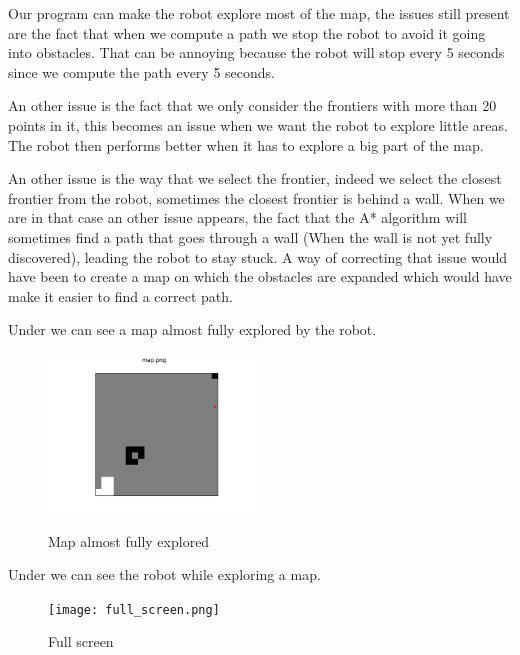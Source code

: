 Our program can make the robot explore most of the map, the issues still present are the fact that when we compute a path we stop the robot to avoid it going into obstacles.
That can be annoying because the robot will stop every 5 seconds since we compute the path every 5 seconds.

An other issue is the fact that we only consider the frontiers with more than 20 points in it, this becomes an issue when we want the robot to explore little areas.
The robot then performs better when it has to explore a big part of the map.

An other issue is the way that we select the frontier, indeed we select the closest frontier from the robot, sometimes the closest frontier is behind a wall.
When we are in that case an other issue appears, the fact that the A* algorithm will sometimes find a path that goes through a wall (When the wall is not yet fully discovered), leading the robot to stay stuck.
A way of correcting that issue would have been to create a map on which the obstacles are expanded which would have make it easier to find a correct path.

Under we can see a map almost fully explored by the robot.

\FloatBarrier
\begin{figure}
    \centering\includegraphics[width=0.5\textwidth]{map.png}
    \label{fig:map}
    \caption{Map almost fully explored}
\end{figure}
\FloatBarrier

Under we can see the robot while exploring a map.

\FloatBarrier
\begin{figure}
    \centering\texttt{[image: full\_screen.png]}
    \label{fig:full_screen}
    \caption{Full screen}
\end{figure}
\FloatBarrier
